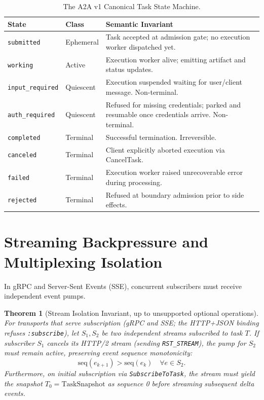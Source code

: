 \documentclass[11pt,twoside,openright]{report}
\theoremstyle{definition}
\theoremstyle{plain}
\newtheorem{theorem}{Theorem}[chapter]
\theoremstyle{remark}
\begin{document}
\begin{table}[htbp]
\centering
\small
\begin{tabularx}{\textwidth}{llX}
\toprule
\textbf{State} & \textbf{Class} & \textbf{Semantic Invariant} \\
\midrule
\texttt{submitted} & Ephemeral & Task accepted at admission gate; no execution worker dispatched yet. \\
\texttt{working} & Active & Execution worker alive; emitting artifact and status updates. \\
\texttt{input\_required} & Quiescent & Execution suspended waiting for user/client message. Non-terminal. \\
\texttt{auth\_required} & Quiescent & Refused for missing credentials; parked and resumable once credentials arrive. Non-terminal. \\
\texttt{completed} & Terminal & Successful termination. Irreversible. \\
\texttt{canceled} & Terminal & Client explicitly aborted execution via CancelTask. \\
\texttt{failed} & Terminal & Execution worker raised unrecoverable error during processing. \\
\texttt{rejected} & Terminal & Refused at boundary admission prior to side effects. \\
\bottomrule
\end{tabularx}
\caption{The A2A v1 Canonical Task State Machine.}
\label{tab:task_states}
\end{table}

\section{Streaming Backpressure and Multiplexing Isolation}
In gRPC and Server-Sent Events (SSE), concurrent subscribers must receive independent event pumps.

\begin{theorem}[Stream Isolation Invariant, up to unsupported optional operations]
For transports that serve subscription (gRPC and SSE; the HTTP+JSON binding refuses \texttt{:subscribe}), let $S_1, S_2$ be two independent streams subscribed to task $T$. If subscriber $S_1$ cancels its HTTP/2 stream (sending \texttt{RST\_STREAM}), the pump for $S_2$ must remain active, preserving event sequence monotonicity:
\[
\mathrm{seq}(e_{k+1}) > \mathrm{seq}(e_k) \quad \forall e \in S_2.
\]
Furthermore, on initial subscription via \texttt{SubscribeToTask}, the stream must yield the snapshot $T_0 = \mathrm{TaskSnapshot}$ as sequence 0 before streaming subsequent delta events.
\end{theorem}
\end{document}
